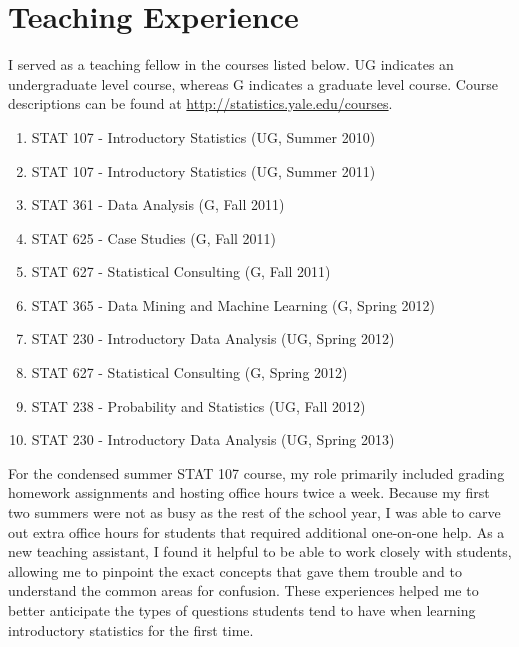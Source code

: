 \documentclass[11pt]{article}
\begin{document}
\section{Teaching Experience}
%
I served as a teaching fellow in the courses listed below. UG indicates an undergraduate level course, whereas G indicates a graduate level course. Course descriptions can be found at \url{http://statistics.yale.edu/courses}.
\begin{enumerate}
  \item STAT 107 - Introductory Statistics (UG, Summer 2010)
  \item STAT 107 - Introductory Statistics (UG, Summer 2011)
  \item STAT 361 - Data Analysis (G, Fall 2011)
  \item STAT 625 - Case Studies (G, Fall 2011)
  \item STAT 627 - Statistical Consulting (G, Fall 2011)
  \item STAT 365 - Data Mining and Machine Learning (G, Spring 2012)
  \item STAT 230 - Introductory Data Analysis (UG, Spring 2012)
  \item STAT 627 - Statistical Consulting (G, Spring 2012)
  \item STAT 238 - Probability and Statistics (UG, Fall 2012)
  \item STAT 230 - Introductory Data Analysis (UG, Spring 2013)
\end{enumerate}
 For the condensed summer STAT 107 course, my role primarily included grading homework assignments and hosting office hours twice a week. Because my first two summers were not as busy as the rest of the school year, I was able to carve out extra office hours for students that required additional one-on-one help. As a new teaching assistant, I found it helpful to be able to work closely with students, allowing me to pinpoint the exact concepts that gave them trouble and to understand the common areas for confusion. These experiences helped me to better anticipate the types of questions students tend to have when learning introductory statistics for the first time.
\end{document}

